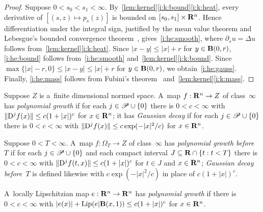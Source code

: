 \documentclass[a4paper,twoside,leqno]{article}
\begin{document}
\begin{proof}
    Suppose $0 < s_0 < s_1 < \infty$. By~\ref{lem:kernel}\ref{i:k:bound}\ref{i:k:heat}, every
    derivative of $[(s,z) \mapsto p_s(z)]$ is bounded on $[s_0,s_1] \times \mathbf{R}^{n}$. Hence
    differentiation under the integral sign, justified by the mean value theorem and Lebesgue's
    bounded convergence theorem~\cite[2.4.9]{Federer1969}, gives~\ref{i:he:smooth}, where $\partial_s
    u = \Delta u$ follows from~\ref{lem:kernel}\ref{i:k:heat}. Since $|x - y| \le |x| + r$ for
    $y \in \mathbf{B}(0,r)$, \ref{i:he:bound} follows from~\ref{i:he:smooth}
    and~\ref{lem:kernel}\ref{i:k:bound}. Since $\max \{ |x| - r, 0 \} \le |x - y| \le |x| + r$ for $y
    \in \mathbf{B}(0,r)$, we obtain~\ref{i:he:gauss}. Finally, \ref{i:he:mass} follows from Fubini's
    theorem~\cite[2.6.2]{Federer1969} and~\ref{lem:kernel}\ref{i:k:mass}.
\end{proof}

\begin{definition}
    \label{def:classes}
    Suppose $Z$ is a~finite dimensional normed space. A~map $f : \mathbf{R}^{n} \to Z$ of
    class~$\infty$ has \emph{polynomial growth} if for each $j \in \mathscr{P} \cup \{0\}$ there is $0 < c <
    \infty$ with $\|\mathrm{D}^j f(x)\| \le c (1 + |x|)^c$ for $x \in \mathbf{R}^{n}$; it has
    \emph{Gaussian decay} if for each $j \in \mathscr{P} \cup \{0\}$ there is $0 < c < \infty$ with $\|\mathrm{D}^j f(x)\|
    \le c \exp(-|x|^2/c)$ for $x \in \mathbf{R}^{n}$.

    Suppose $0 < T < \infty$. A~map $f : \Omega_T \to Z$ of class~$\infty$ has \emph{polynomial
    growth before~$T$} if for each $j \in \mathscr{P} \cup \{0\}$ and each compact interval $J \subseteq \mathbf{R} \cap \{ t
    : t < T \}$ there is $0 < c < \infty$ with $\|\mathrm{D}^j f(t,x)\| \le c (1 + |x|)^c$ for $t \in
    J$ and $x \in \mathbf{R}^{n}$; \emph{Gaussian decay before~$T$} is defined likewise with $c
    \exp(-|x|^2/c)$ in place of $c (1 + |x|)^c$.

    A~locally Lipschitzian map $e : \mathbf{R}^{n} \to \mathbf{R}^{n}$ has \emph{polynomial growth} if
    there is $0 < c < \infty$ with $|e(x)| + \operatorname{Lip}(e|\mathbf{B}(x,1)) \le c (1 + |x|)^c$ for $x \in
    \mathbf{R}^{n}$.
\end{definition}
\end{document}
